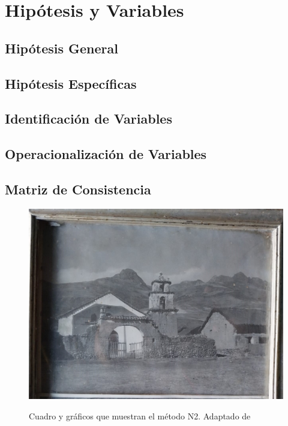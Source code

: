 \section{Hipótesis y Variables}

\subsection{Hipótesis General}

\subsection{Hipótesis Específicas}

\subsection{Identificación de Variables}

\subsection{Operacionalización de Variables}

\subsection{Matriz de Consistencia}

\lipsum[17]

\lipsum[18]

\begin{figure}[!ht]
  \caption{Cuadro y gráficos que muestran el método N2. Adaptado de \cite{deWaal2009}}
  \includegraphics[scale=0.36]{F_Figures/15_Chapter VI/Cap6_Imagen1.jpeg}
	\label{Cap3_Figura3}
\end{figure}

\lipsum[19]